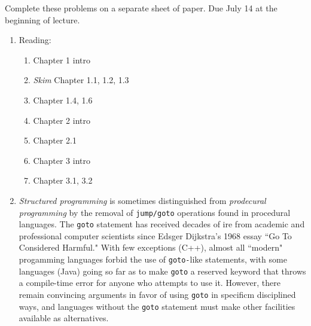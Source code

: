 \documentclass[9pt]{article}
\begin{document}
\noindent Complete these problems on a separate sheet of paper. Due July 14 at
the beginning of lecture.
\begin{enumerate}
   \item Reading:

         \begin{enumerate}
            \item Chapter 1 intro
            \item \textit{Skim} Chapter 1.1, 1.2, 1.3
            \item Chapter 1.4, 1.6
            \item Chapter 2 intro
            \item Chapter 2.1
            \item Chapter 3 intro
            \item Chapter 3.1, 3.2
         \end{enumerate}
   \item \textit{Structured programming} is sometimes distinguished from
         \textit{prodecural programming} by the removal of \verb|jump/goto|
         operations found in procedural languages. The \verb|goto| statement has
         received decades of ire from academic and professional computer
         scientists since Edsger Dijkstra's 1968 essay ``Go To Considered
         Harmful." With few exceptions (C++), almost all ``modern" progamming
         languages forbid the use of \verb|goto-|like statements, with some
         languages (Java) going so far as to make \verb|goto| a reserved keyword
         that throws a compile-time error for anyone who attempts to use it.
         However, there remain convincing arguments in favor of using
         \verb|goto| in specificm disciplined ways, and languages without the
         \verb|goto| statement must make other facilities available as 
         alternatives. \\


\end{enumerate}
\end{document}
